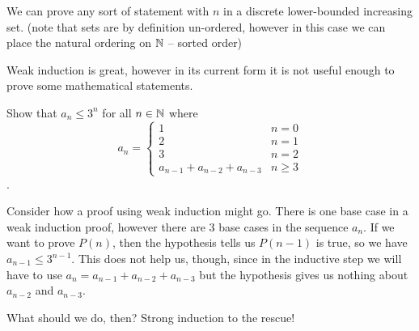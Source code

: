 \documentclass[main.tex]{subfiles}
\begin{document}
We can prove any sort of statement with \(n\) in a discrete lower-bounded increasing set. (note that sets are by definition un-ordered, however in this case we can place the natural ordering on \(\mathbb{N}\) -- sorted order)


\sectionbreak

Weak induction is great, however in its current form it is not useful enough to prove some mathematical statements.

\begin{example}
	\label{first-strong-proof}
	Show that \(a_n \leq 3^n\) for all \(n \in \mathbb{N}\) where \[a_n = \begin{cases} 1 & n=0 \\ 2 & n=1 \\ 3 & n=2 \\ a_{n-1} + a_{n-2} + a_{n-3} & n \geq 3 \end{cases}\].
	
	Consider how a proof using weak induction might go. There is one base case in a weak induction proof, however there are 3 base cases in the sequence \(a_n\). If we want to prove \(P(n)\), then the hypothesis tells us \(P(n-1)\) is true, so we have \(a_{n-1} \leq 3^{n-1}\). This does not help us, though, since in the inductive step we will have to use \(a_n = a_{n-1} + a_{n-2} + a_{n-3}\) but the hypothesis gives us nothing about \(a_{n-2}\) and \(a_{n-3}\).
	
	What should we do, then? Strong induction to the rescue!
\end{example}
\end{document}
